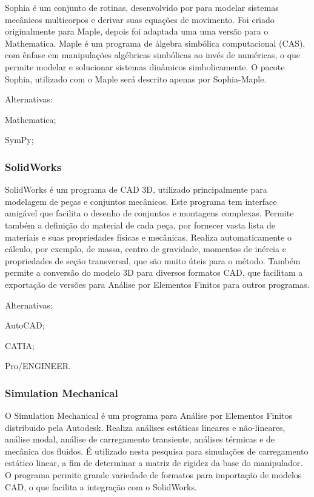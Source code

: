 Sophia é um conjunto de rotinas, desenvolvido por \citet{lesser1995analysis}
para modelar sistemas mecânicos multicorpos e derivar suas equações de
movimento. Foi criado originalmente para Maple, depois foi adaptada uma uma
versão para o Mathematica.
Maple\cite{maple} é um programa de álgebra simbólica computacional (CAS), com
ênfase em manipulações algébricas simbólicas ao invés de numéricas, o que
permite modelar e solucionar sistemas dinâmicos simbolicamente. O pacote Sophia,
utilizado com o Maple será descrito apenas por Sophia-Maple.

Alternativas:
%
\begin{enumerate*}
	\item Mathematica;
	\item SymPy;
\end{enumerate*}

\subsubsection{SolidWorks}

SolidWorks\cite{solidworks} é um programa de CAD 3D, utilizado principalmente
para modelagem de peças e conjuntos mecânicos.
Este programa tem interface amigável que facilita o desenho de conjuntos e
montagens complexas. Permite também a definição do material de cada peça, por
fornecer vasta lista de materiais e suas propriedades físicas e mecânicas.
Realiza automaticamente o cálculo, por exemplo, de massa, centro de
gravidade, momentos de inércia e propriedades de seção transversal, que são
muito úteis para o método. Também permite a conversão do modelo 3D para diversos
formatos CAD, que facilitam a exportação de versões para Análise por Elementos
Finitos para outros programas.

Alternativas:
%
\begin{enumerate*}
	\item AutoCAD;
	\item CATIA;
	\item Pro/ENGINEER.
\end{enumerate*}

\subsubsection{Simulation Mechanical}

O Simulation Mechanical\cite{autodesk} é um programa para Análise por Elementos
Finitos distribuido pela Autodesk.  Realiza análises estáticas lineares e não-lineares,
análise modal, análise de carregamento transiente, análises térmicas e de
mecânica dos fluidos.
É utilizado nesta pesquisa para simulações de carregamento estático linear, a
fim de determinar a matriz de rigidez da base do manipulador. O programa permite
grande variedade de formatos para importação de modelos CAD, o que facilita a
integração com o SolidWorks.

